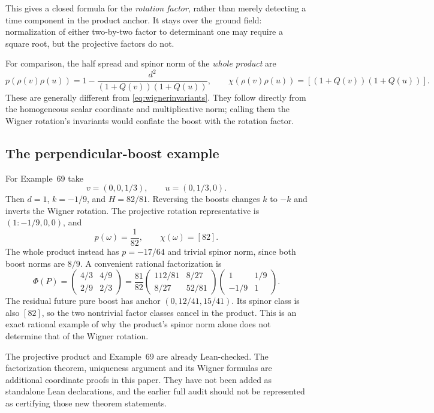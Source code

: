 \documentclass[11pt]{article}
\theoremstyle{remark}
\begin{document}
This gives a closed formula for the \emph{rotation factor}, rather than
merely detecting a time component in the product anchor. It stays over the
ground field: normalization of either two-by-two factor to determinant one
may require a square root, but the projective factors do not.

For comparison, the half spread and spinor norm of the \emph{whole product}
are
\begin{equation}
 p(\rho(v)\rho(u))
   =1-\frac{d^2}{(1+Q(v))(1+Q(u))},\qquad
 \chi(\rho(v)\rho(u))=[(1+Q(v))(1+Q(u))].
 \label{eq:wholeproduct}
\end{equation}
These are generally different from \eqref{eq:wignerinvariants}. They follow
directly from the homogeneous scalar coordinate and multiplicative norm;
calling them the Wigner rotation's invariants would conflate the boost with
the rotation factor.

\subsection{The perpendicular-boost example}

For Example~69 take
\[
 v=(0,0,1/3),\qquad u=(0,1/3,0).
\]
Then \(d=1\), \(k=-1/9\), and \(H=82/81\). Reversing the boosts
changes \(k\) to \(-k\) and inverts the Wigner rotation. The projective
rotation representative is \((1:-1/9,0,0)\), and
\[
 p(\omega)=\frac1{82},\qquad\chi(\omega)=[82].
\]
The whole product instead has \(p=-17/64\) and trivial spinor norm, since
both boost norms are \(8/9\). A convenient rational factorization is
\[
 \Phi(P)=
 \begin{pmatrix}4/3&4/9\\2/9&2/3\end{pmatrix}
 =\frac{81}{82}
 \begin{pmatrix}112/81&8/27\\8/27&52/81\end{pmatrix}
 \begin{pmatrix}1&1/9\\-1/9&1\end{pmatrix}.
\]
The residual future pure boost has anchor \((0,12/41,15/41)\). Its
spinor class is also \([82]\), so the two nontrivial factor classes cancel
in the product. This is an exact rational example of why the product's
spinor norm alone does not determine that of the Wigner rotation.

The projective product and Example~69 are already Lean-checked. The
factorization theorem, uniqueness argument and its Wigner formulas are
additional coordinate proofs in this paper. They have not been added as
standalone Lean declarations, and the earlier full audit should not be
represented as certifying those new theorem statements.
\end{document}
